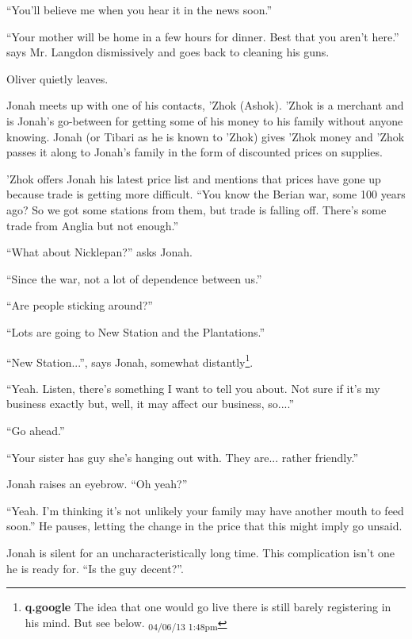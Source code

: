 ``You'll believe me when you hear it in the news soon.''

``Your mother will be home in a few hours for dinner.  Best that you aren't here.'' says Mr. Langdon dismissively and goes back to cleaning his guns.

Oliver quietly leaves.





Jonah meets up with one of his contacts, 'Zhok (Ashok).   'Zhok is a merchant and is Jonah's go-between for getting some of his money to his family without anyone knowing.  Jonah (or Tibari as he is known to 'Zhok) gives 'Zhok money and 'Zhok passes it along to Jonah's family in the form of discounted prices on supplies.



'Zhok offers Jonah his latest price list and mentions that prices have gone up because trade is getting more difficult.  ``You know the Berian war, some 100 years ago?  So we got some stations from them, but trade is falling off.  There's some trade from Anglia but not enough.''

``What about Nicklepan?'' asks Jonah.

``Since the war, not a lot of dependence between us.''

``Are people sticking around?''

``Lots are going to New Station and the Plantations.''

``New Station...'', says Jonah, somewhat distantly\footnote{\textbf{q.google }The idea that one would go live there is still barely registering in his mind.  But see below. \textsubscript{04/06/13 1:48pm}}.

``Yeah.  Listen, there's something I want to tell you about.  Not sure if it's my business exactly but, well, it may affect our business, so....''

``Go ahead.''

``Your sister has guy she's hanging out with.  They are... rather friendly.''

Jonah raises an eyebrow.  ``Oh yeah?''

``Yeah.  I'm thinking it's not unlikely your family may have another mouth to feed soon.''  He pauses, letting the change in the price that this might imply go unsaid.

Jonah is silent for an uncharacteristically long time.  This complication isn't one he is ready for.  ``Is the guy decent?''.

